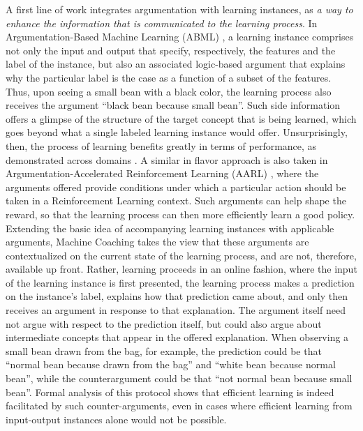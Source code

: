 A first line of work integrates argumentation with learning instances, as \emph{a way to enhance the information that is communicated to the learning process}.
In Argumentation-Based Machine Learning (ABML) , a learning instance comprises not only the input and output that specify, respectively, the features and the label of the instance, but also an associated logic-based argument that explains why the particular label is the case as a function of a subset of the features. Thus, upon seeing a small bean with a black color, the learning process also receives the argument ``black bean because small bean''.
Such side information offers a glimpse of the structure of the target concept that is being learned, which goes beyond what a single labeled learning instance would offer. Unsurprisingly, then, the process of learning benefits greatly in terms of performance, as demonstrated across domains .
A similar in flavor approach is also taken in Argumentation-Accelerated Reinforcement Learning (AARL) , where the arguments offered provide conditions under which a particular action should be taken in a Reinforcement Learning context. Such arguments can help shape the reward, so that the learning process can then more efficiently learn a good policy.
Extending the basic idea of accompanying learning instances with applicable arguments, Machine Coaching  takes the view that these arguments are contextualized on the current state of the learning process, and are not, therefore, available up front. Rather, learning proceeds in an online fashion, where the input of the learning instance is first presented, the learning process makes a prediction on the instance's label, explains how that prediction came about, and only then receives an argument in response to that explanation. The argument itself need not argue with respect to the prediction itself, but could also argue about intermediate concepts that appear in the offered explanation.
When observing a small bean drawn from the bag, for example, the prediction could be that ``normal bean because drawn from the bag'' and ``white bean because normal bean'', while the counterargument could be that ``not normal bean because small bean''. Formal analysis of this protocol shows that efficient learning is indeed facilitated by such counter-arguments, even in cases where efficient learning from input-output instances alone would not be possible.

